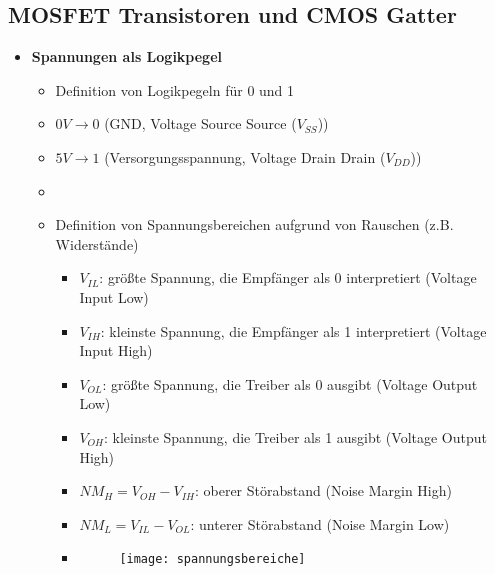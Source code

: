 \subsection{MOSFET Transistoren und CMOS Gatter}
\begin{itemize}

\item \textbf{Spannungen als Logikpegel}
	\begin{itemize}
	\item Definition von Logikpegeln für 0 und 1
	\item $0V \rightarrow 0$ (GND, Voltage Source Source ($V_{SS}$))
	\item $5V \rightarrow 1$ (Versorgungsspannung, Voltage Drain Drain ($V_{DD}$))
	\item[]
	\item Definition von Spannungsbereichen aufgrund von Rauschen (z.B. Widerstände)
		\begin{itemize}
		\item $V_{IL}$: größte Spannung, die Empfänger als 0 interpretiert (Voltage Input Low)
		\item $V_{IH}$: kleinste Spannung, die Empfänger als 1 interpretiert (Voltage Input High)
		\item $V_{OL}$: größte Spannung, die Treiber als 0 ausgibt (Voltage Output Low)
		\item $V_{OH}$: kleinste Spannung, die Treiber als 1 ausgibt (Voltage Output High)
		\item $NM_H= V_{OH} - V_{IH}$: oberer Störabstand (Noise Margin High)
		\item $NM_L = V_{IL} - V_{OL}$: unterer Störabstand (Noise Margin Low)
		\item[] \begin{figure}[H]
				\begin{center}
				\texttt{[image: spannungsbereiche]}
				\end{center}
				\end{figure}
		\end{itemize}
	\end{itemize}


\end{itemize}
